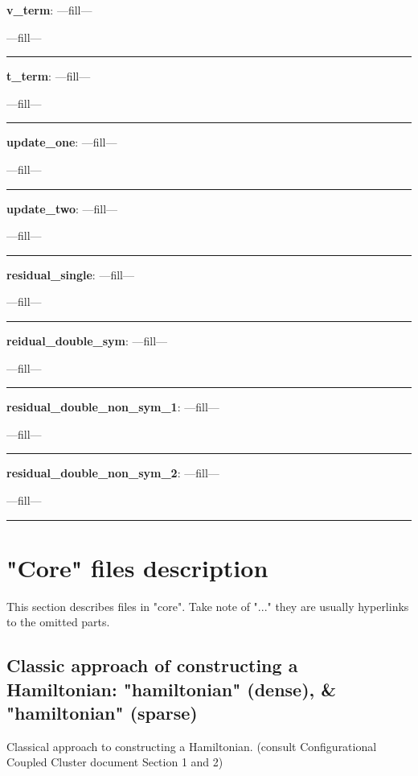 \documentclass[a4paper,10pt]{article}
\begin{document}
\textbf{v\_term}: ---fill---

---fill---

\noindent\rule{\linewidth}{0.4pt}

\textbf{t\_term}: ---fill---

---fill---

\noindent\rule{\linewidth}{0.4pt}

\textbf{update\_one}: ---fill---

---fill---

\noindent\rule{\linewidth}{0.4pt}

\textbf{update\_two}: ---fill---

---fill---

\noindent\rule{\linewidth}{0.4pt}

\textbf{residual\_single}: ---fill---

---fill---

\noindent\rule{\linewidth}{0.4pt}

\textbf{reidual\_double\_sym}: ---fill---

---fill---

\noindent\rule{\linewidth}{0.4pt}

\textbf{residual\_double\_non\_sym\_1}: ---fill---

---fill---

\noindent\rule{\linewidth}{0.4pt}

\textbf{residual\_double\_non\_sym\_2}: ---fill---

---fill---

\noindent\rule{\linewidth}{0.4pt}





\section{"Core" files description}

This section describes files in "core". Take note of "..." they are usually hyperlinks to the omitted parts.




\subsection{Classic approach of constructing a Hamiltonian: "hamiltonian" (dense), \& "hamiltonian" (sparse)}

Classical approach to constructing a Hamiltonian. (consult Configurational Coupled Cluster document Section 1 and 2)\newline
\end{document}
